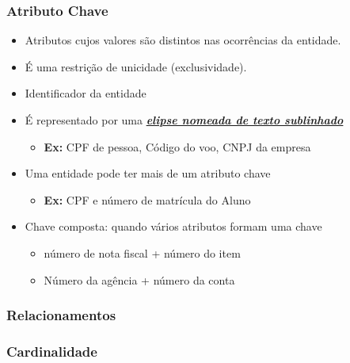 \documentclass[12pt,a4paper,titlepage]{article}
\begin{document}
\newpage %

\subsubsection{Atributo Chave}

\begin{itemize}
    \item Atributos cujos valores são distintos nas ocorrências da entidade.
    \item É uma restrição de unicidade (exclusividade).
    \item Identificador da entidade
    \item É representado por uma \textbf{\textit{\underline{elipse nomeada de texto sublinhado}}}
        \begin{itemize}
            \item \textbf{Ex:} CPF de pessoa, Código do voo, CNPJ da empresa
        \end{itemize}
    \item Uma entidade pode ter mais de um atributo chave
        \begin{itemize}
            \item \textbf{Ex:} CPF e número de matrícula do Aluno
        \end{itemize}
    \item Chave composta: quando vários atributos formam uma chave
        \begin{itemize}
            \item número de nota fiscal + número do item
            \item Número da agência + número da conta
        \end{itemize}
\end{itemize}

\subsubsection{Relacionamentos}

\subsubsection{Cardinalidade}
\end{document}

